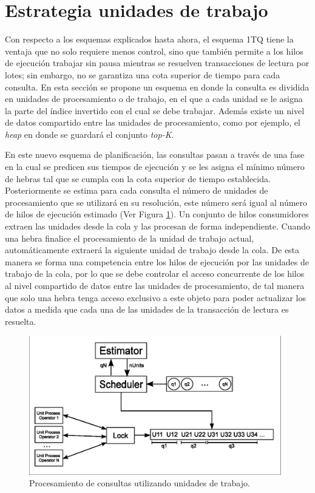 \section{Estrategia unidades de trabajo}
\label{scheduling:unidadestrabajo}
Con respecto a los esquemas explicados hasta ahora, el esquema 1TQ tiene la ventaja que no solo requiere menos control, sino que también permite a los hilos de ejecución trabajar sin pausa mientras se resuelven transacciones de lectura por lotes; sin embargo, no se garantiza una cota superior de tiempo para cada consulta. En esta sección se propone un esquema en donde la consulta es dividida en unidades de procesamiento o de trabajo, en el que a cada unidad se le asigna la parte del índice invertido con el cual se debe trabajar. Además existe un nivel de datos compartido entre las unidades de procesamiento, como por ejemplo, el \textit{heap} en donde se guardará el conjunto \textit{top-K}.

En este nuevo esquema de planificación, las consultas pasan a través de una fase en la cual se predicen sus tiempos de ejecución y se les asigna el mínimo número de hebras tal que se cumpla con la cota superior de tiempo establecida. Posteriormente se estima para cada consulta el número de unidades de procesamiento que se utilizará en su resolución, este número será igual al número de hilos de ejecución estimado (Ver Figura \ref{fig:unit_process}). Un conjunto de hilos consumidores extraen las unidades desde la cola y las procesan de forma independiente. Cuando una hebra finalice el procesamiento de la unidad de trabajo actual, automáticamente extraerá la siguiente unidad de trabajo desde la cola. De esta manera se forma una competencia entre los hilos de ejecución por las unidades de trabajo de la cola, por lo que se debe controlar el acceso concurrente de los hilos al nivel compartido de datos entre las unidades de procesamiento, de tal manera que solo una hebra tenga acceso exclusivo a este objeto para poder actualizar los datos a medida que cada una de las unidades de la transacción de lectura es resuelta.

\begin{figure}[tp]
\centering
\includegraphics[scale=.75]{images/unit_process.eps}
\caption{Procesamiento de consultas utilizando unidades de trabajo.}
\label{fig:unit_process}
\end{figure}

